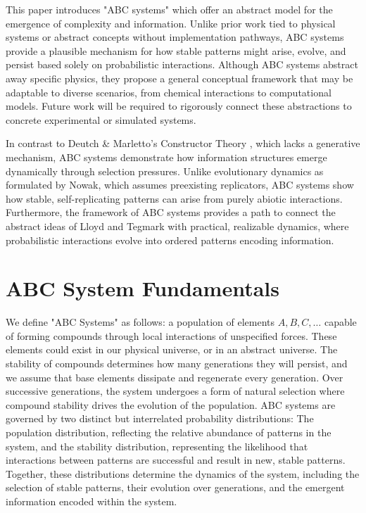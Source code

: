 \documentclass[entropy,article,submit,pdftex,moreauthors]{Definitions/mdpi}
\begin{document}
This paper introduces "ABC systems" which offer an abstract model for the emergence of complexity and information. Unlike prior work tied to physical systems or abstract concepts without implementation pathways, ABC systems provide a plausible mechanism for how stable patterns might arise, evolve, and persist based solely on probabilistic interactions. Although ABC systems abstract away specific physics, they propose a general conceptual framework that may be adaptable to diverse scenarios, from chemical interactions to computational models. Future work will be required to rigorously connect these abstractions to concrete experimental or simulated systems.

In contrast to Deutch \& Marletto's Constructor Theory \cite{deutsch2013constructor}, which lacks a generative mechanism, ABC systems demonstrate how information structures emerge dynamically through selection pressures. Unlike evolutionary dynamics as formulated by Nowak, which assumes preexisting replicators, ABC systems show how stable, self-replicating patterns can arise from purely abiotic interactions. Furthermore, the framework of ABC systems provides a path to connect the abstract ideas of Lloyd and Tegmark with practical, realizable dynamics, where probabilistic interactions evolve into ordered patterns encoding information.

\section{ABC System Fundamentals}

We define "ABC Systems" as follows: a population of elements \( A, B, C, \dots \) capable of forming compounds through local interactions of unspecified forces. These elements could exist in our physical universe, or in an abstract universe. The stability of compounds determines how many generations they will persist, and we assume that base elements dissipate and regenerate every generation. Over successive generations, the system undergoes a form of natural selection where compound stability drives the evolution of the population. ABC systems are governed by two distinct but interrelated probability distributions: The population distribution, reflecting the relative abundance of patterns in the system, and the stability distribution, representing the likelihood that interactions between patterns are successful and result in new, stable patterns. Together, these distributions determine the dynamics of the system, including the selection of stable patterns, their evolution over generations, and the emergent information encoded within the system.
\end{document}
